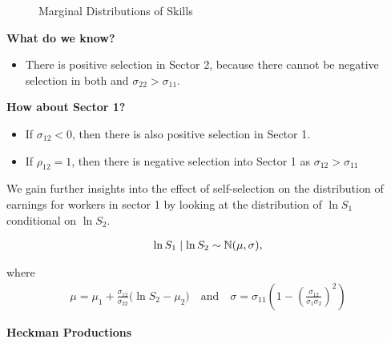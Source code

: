 \begin{frame}
\begin{figure}[htp]\centering
\caption{Marginal Distributions of Skills}\label{Marginal Distributions of Skills}
\end{figure}
\end{frame}



\begin{frame}
\textbf{What do we know?}
\begin{itemize}\setlength\itemsep{1em}
\item There is positive selection in Sector 2, because there cannot be negative selection in both and $\sigma_{22} > \sigma_{11}$.
\end{itemize}\vspace{0.5cm}

\textbf{How about Sector 1?}
\begin{itemize}\setlength\itemsep{1em}
\item If $\sigma_{12} < 0$, then there is also positive selection in Sector 1.
\item If $\rho_{12} = 1$, then there is negative selection into Sector 1 as $\sigma_{12} > \sigma_{11}$
\end{itemize}

\end{frame}


\begin{frame}

We gain further insights into the effect of self-selection on the distribution of earnings for workers in sector 1 by looking at the  distribution of $\ln S_1$  conditional on $\ln S_2$.

\begin{align*}
\ln S_1 \mid \ln S_2 \sim \mathbb{N} (\mu, \sigma),
\end{align*}

where
\begin{align*}
\mu = \mu_1 + \frac{\sigma_{12}}{\sigma_{22}} \Bigg(\ln S_2 - \mu_2\Bigg) \quad\text{and}\quad
\sigma = \sigma_{11} \left(1 - \left(\frac{\sigma_{12}}{\sigma_1 \sigma_2}\right)^2\right)
\end{align*}

\end{frame}

\begin{frame}\begin{center}
\LARGE\textbf{Heckman Productions}
\end{center}\end{frame}



